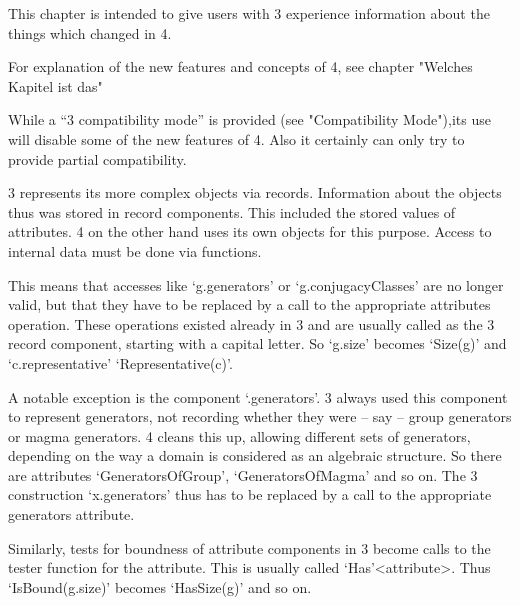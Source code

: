 

This chapter is intended to give users with {\GAP}3 experience
information about the things which changed in {\GAP}4.

For explanation of the new features and concepts of {\GAP}4, see chapter
"Welches Kapitel ist das"

While a ``{\GAP}3 compatibility mode'' is provided (see "Compatibility
Mode"),its use will disable some of the new features of {\GAP}4. Also it
certainly can only try to provide partial compatibility.


{\GAP}3 represents its more complex objects via records. Information about the
objects thus was stored in record components. This included the stored
values of attributes. {\GAP}4 on the other hand uses its own objects for
this purpose. Access to internal data must be done via functions.

This means that accesses like `g.generators' or `g.conjugacyClasses' are no
longer valid, but that they have to be replaced by a call to the
appropriate attributes operation. These operations existed already in
{\GAP}3 and are usually called as the {\GAP}3 record component,
starting with a capital letter. 
So `g.size' becomes `Size(g)' and `c.representative' `Representative(c)'.

A notable exception is the component `.generators'. {\GAP}3 always used this
component to represent generators, not recording whether they were -- say --
group generators or magma generators. {\GAP}4 cleans this up, allowing
different sets of generators, depending on the way a domain is considered as
an algebraic structure. So there are attributes `GeneratorsOfGroup',
`GeneratorsOfMagma' and so on. The {\GAP}3 construction `x.generators' thus
has to be replaced by a call to the appropriate generators attribute.

Similarly, tests for boundness of attribute components in {\GAP}3 become
calls to the tester function for the attribute. This is usually called
`Has'<attribute>. Thus `IsBound(g.size)' becomes `HasSize(g)' and so on.

